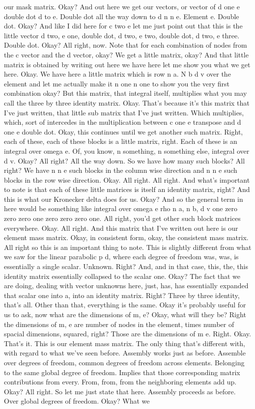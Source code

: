 \documentclass[10pt]{article}
\begin{document}
our mask matrix. Okay? And out here we get our vectors, or vector of d one e double dot d to e. Double dot all the way down to d n n e. Element e. Double dot. Okay? And like I did here for c two e let me just point out that this is the little vector d two, e one, double dot, d two, e two, double dot, d two, e three. Double dot. Okay? All right, now. Note that for each combination of nodes from the c vector and the d vector, okay? We get a little matrix, okay? And that little matrix is obtained by writing out here we have here let me show you what we get here. Okay. We have here a little matrix which is row n a. N b d v over the element and let me actually make it n one n one to show you the very first combination okay? But this matrix, that integral itself, multiplies what you may call the three by three identity matrix. Okay. That's because it's this matrix that I've just written, that little sub matrix that I've just written. Which multiplies, which, sort of intercedes in the multiplication between c one e transpose and d one e double dot. Okay, this continues until we get another such matrix. Right, each of these, each of these blocks is a little matrix, right. Each of these is an integral over omega e. Of, you know, n something, n something else, integral over d v. Okay? All right? All the way down. So we have how many such blocks? All right? We have n n e such blocks in the column wise direction and n n e such blocks in the row wise direction. Okay. All right. All right. And what's important to note is that each of these little matrices is itself an identity matrix, right? And this is what our Kronecker delta does for us. Okay? And so the general term in here would be something like integral over omega e rho n a, n b, d v one zero zero zero one zero zero zero one. All right, you'd get other such block matrices everywhere. Okay. All right. And this matrix that I've written out here is our element mass matrix. Okay, in consistent form, okay, the consistent mass matrix. All right so this is an important thing to note. This is slightly different from what we saw for the linear parabolic p d, where each degree of freedom was, was, is essentially a single scalar. Unknown. Right? And, and in that case, this, the, this identity matrix essentially collapsed to the scalar one. Okay? The fact that we are doing, dealing with vector unknowns here, just, has, has essentially expanded that scalar one into a, into an identity matrix. Right? Three by three identity, that's all. Other than that, everything is the same. Okay it's probably useful for us to ask, now what are the dimensions of m, e? Okay, what will they be? Right the dimensions of m, e are number of nodes in the element, times number of spacial dimensions, squared, right? Those are the dimensions of m e. Right. Okay. That's it. This is our element mass matrix. The only thing that's different with, with regard to what we've seen before. Assembly works just as before. Assemble over degrees of freedom, common degrees of freedom across elements. Belonging to the same global degree of freedom. Implies that those corresponding matrix contributions from every. From, from, from the neighboring elements add up. Okay? All right. So let me just state that here. Assembly proceeds as before. Over global degrees of freedom. Okay? What we 
\end{document}
